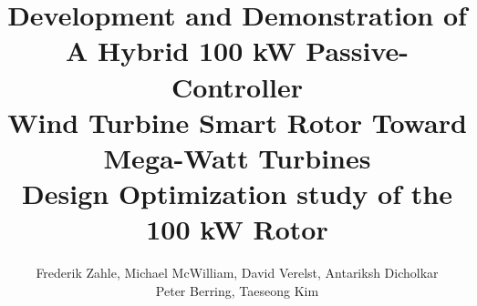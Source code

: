 \documentclass[
oneside,
paper=a4,
fontsize=9pt,
parskip=half,        %
DIV=12,              %
BCOR=10mm,           %
headings=normal,
appendixprefix=true, %
]{scrbook}			%
\begin{document}
\title{
Development and Demonstration of A Hybrid 100 kW Passive-Controller\\
Wind Turbine Smart Rotor Toward Mega-Watt Turbines\\
\vspace{0.5cm}
\large Design Optimization study of the 100 kW Rotor
}
\vspace{0.5cm}
\author{Frederik Zahle, Michael McWilliam, David Verelst, Antariksh Dicholkar \\Peter Berring, Taeseong Kim}

\maketitle


\tableofcontents



\clearpage

\clearpage

%
\clearpage





\appendix



\end{document}
